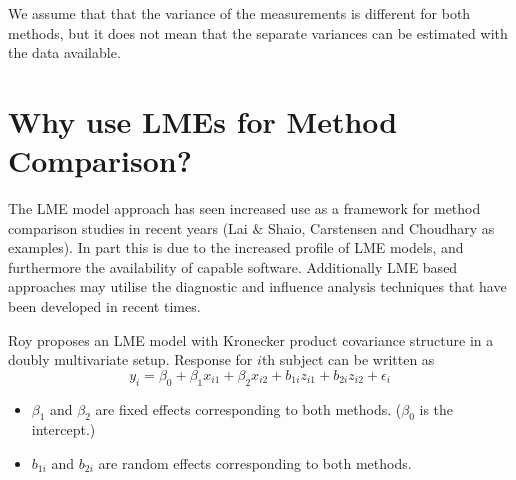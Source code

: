 \documentclass[12pt, a4paper]{report}
\theoremstyle{plain}
\theoremstyle{definition}
\theoremstyle{remark}
\begin{document}
We assume that that the variance of the measurements is different for both methods, but it does not mean that the separate variances can be estimated with the data available.















	\section{Why use LMEs for Method Comparison?}
	The LME model approach has seen increased use as a framework for method comparison studies in recent years (Lai $\&$ Shaio, Carstensen and Choudhary as examples). In part this is due to the increased profile of LME models, and furthermore the availability of capable software. Additionally LME based approaches may utilise the diagnostic and influence analysis techniques that have been developed in recent times.
	
	
	Roy proposes an LME model with Kronecker product covariance structure in a doubly multivariate setup. Response for $i$th subject can be written as
	\[ y_i = \beta_0 + \beta_1x_{i1} + \beta_2x_{i2} + b_{1i}z_{i1}  + b_{2i}z_{i2} + \epsilon_i \]
	\begin{itemize}
		\item $\beta_1$ and $\beta_2$ are fixed effects corresponding to both methods. ($\beta_0$ is the intercept.)
		\item $b_{1i}$ and $b_{2i}$ are random effects corresponding to both methods.
	\end{itemize}
	
\end{document}
